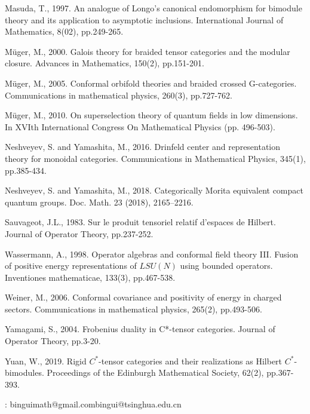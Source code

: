 \documentclass[11pt,b5paper,notitlepage]{article}
\theoremstyle{definition}
\theoremstyle{plain}
\numberwithin{equation}{section}
\begin{document}
\begin{thebibliography}{999999}
Masuda, T., 1997. An analogue of Longo's canonical endomorphism for bimodule theory and its application to asymptotic inclusions. International Journal of Mathematics, 8(02), pp.249-265.

Müger, M., 2000. Galois theory for braided tensor categories and the modular closure. Advances in Mathematics, 150(2), pp.151-201.

Müger, M., 2005. Conformal orbifold theories and braided crossed G-categories. Communications in mathematical physics, 260(3), pp.727-762.

Müger, M., 2010. On superselection theory of quantum fields in low dimensions. In XVIth International Congress On Mathematical Physics (pp. 496-503).

Neshveyev, S. and Yamashita, M., 2016. Drinfeld center and representation theory for monoidal categories. Communications in Mathematical Physics, 345(1), pp.385-434.

Neshveyev, S. and Yamashita, M., 2018. Categorically Morita equivalent compact quantum
groups. Doc. Math. 23 (2018), 2165–2216.

Sauvageot, J.L., 1983. Sur le produit tensoriel relatif d'espaces de Hilbert. Journal of Operator Theory, pp.237-252.

Wassermann, A., 1998. Operator algebras and conformal field theory III. Fusion of positive energy representations of $LSU(N)$ using bounded operators. Inventiones mathematicae, 133(3), pp.467-538.

Weiner, M., 2006. Conformal covariance and positivity of energy in charged sectors. Communications in mathematical physics, 265(2), pp.493-506.

Yamagami, S., 2004. Frobenius duality in C*-tensor categories. Journal of Operator Theory, pp.3-20.

Yuan, W., 2019. Rigid $C^*$-tensor categories and their realizations as Hilbert $C^*$-bimodules. Proceedings of the Edinburgh Mathematical Society, 62(2), pp.367-393.

		
		
\end{thebibliography}


: binguimath@gmail.com\qquad bingui@tsinghua.edu.cn
\end{document}
